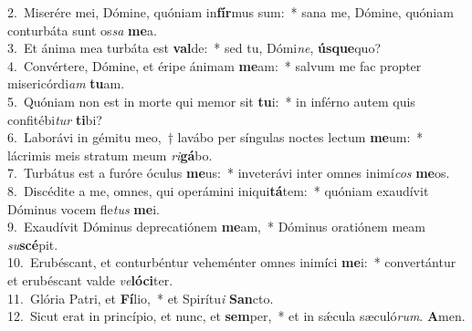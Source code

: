 {2.~}Miserére mei, Dómine, quóniam in\textbf{fír}mus sum:~* sana me, Dómine, quóniam conturbáta sunt os\textit{sa} \textbf{me}a.\\
{3.~}Et ánima mea turbáta est \textbf{val}de:~* sed tu, Dómi\textit{ne}, \textbf{ús}\textbf{que}quo?\\
{4.~}Convértere, Dómine, et éripe ánimam \textbf{me}am:~* salvum me fac propter misericórdi\textit{am} \textbf{tu}am.\\
{5.~}Quóniam non est in morte qui memor sit \textbf{tu}i:~* in inférno autem quis confitébi\textit{tur} \textbf{ti}bi?\\
{6.~}Laborávi in gémitu meo,~† lavábo per síngulas noctes lectum \textbf{me}um:~* lácrimis meis stratum meum \textit{ri}\textbf{gá}bo.\\
{7.~}Turbátus est a furóre óculus \textbf{me}us:~* inveterávi inter omnes inimí\textit{cos} \textbf{me}os.\\
{8.~}Discédite a me, omnes, qui operámini iniqui\textbf{tá}tem:~* quóniam exaudívit Dóminus vocem fle\textit{tus} \textbf{me}i.\\
{9.~}Exaudívit Dóminus deprecatiónem \textbf{me}am,~* Dóminus oratiónem meam \textit{su}\textbf{scé}pit.\\
{10.~}Erubéscant, et conturbéntur veheménter omnes inimíci \textbf{me}i:~* convertántur et erubéscant valde \textit{ve}\textbf{ló}\textbf{ci}ter.\\
{11.~}Glória Patri, et \textbf{Fí}lio,~* et Spirítu\textit{i} \textbf{San}cto.\\
{12.~}Sicut erat in princípio, et nunc, et \textbf{sem}per,~* et in sǽcula sæculó\textit{rum}. \textbf{A}men.\\
